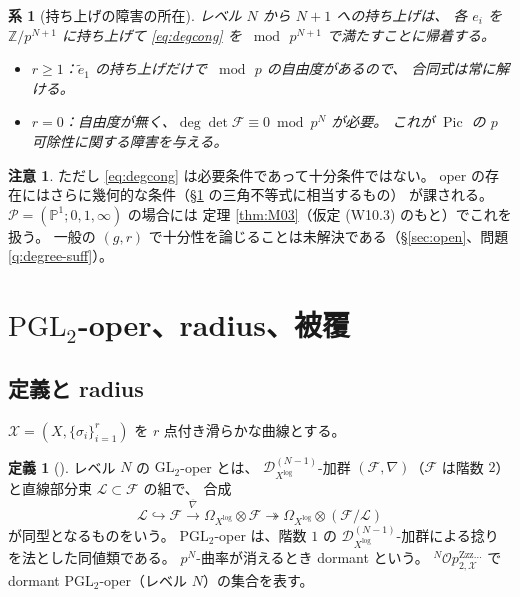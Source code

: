 \documentclass[a4paper,11pt]{ltjsarticle}
\theoremstyle{plain}
\newtheorem{corollary}[theorem]{系}
\theoremstyle{definition}
\newtheorem{definition}[theorem]{定義}
\newtheorem{remark}[theorem]{注意}
\newcommand{\bbP}{\mathbb{P}}
\newcommand{\bbZ}{\mathbb{Z}}
\newcommand{\cD}{\mathcal{D}}
\newcommand{\cF}{\mathcal{F}}
\newcommand{\cL}{\mathcal{L}}
\newcommand{\sX}{\mathscr{X}}
\newcommand{\sP}{\mathscr{P}}
\newcommand{\Pic}{\operatorname{Pic}}
\newcommand{\Op}{\mathcal{O}p}
\newcommand{\Zzz}{\mathrm{Zzz\dots}}
\newcommand{\Dlog}[1]{\cD^{(#1)}_{X^{\log}}}
\begin{document}
\begin{corollary}[持ち上げの障害の所在]\label{cor:obstruction}
レベル $N$ から $N+1$ への持ち上げは、
各 $e_i$ を $\bbZ/p^{N+1}$ に持ち上げて \eqref{eq:degcong} を
$\bmod\,p^{N+1}$ で満たすことに帰着する。
\begin{itemize}[leftmargin=1.6em]
\item $r\ge1$：$\tilde e_1$ の持ち上げだけで $\bmod\,p$ の自由度があるので、
      合同式は常に解ける。
\item $r=0$：自由度が無く、$\deg\det\cF\equiv0\bmod p^{N}$ が必要。
      これが $\Pic$ の $p$ 可除性に関する障害を与える。
\end{itemize}
\end{corollary}

\begin{remark}
ただし \eqref{eq:degcong} は必要条件であって十分条件ではない。
oper の存在にはさらに幾何的な条件（\S\ref{sec:opers} の三角不等式に相当するもの）
が課される。$\sP=(\bbP^1;0,1,\infty)$ の場合には
定理 \ref{thm:M03}（仮定 (W10.3) のもと）でこれを扱う。
一般の $(g,r)$ で十分性を論じることは未解決である（\S\ref{sec:open}、問題 \ref{q:degree-suff}）。
\end{remark}

\section{$\mathrm{PGL}_2$-oper、radius、被覆}\label{sec:opers}

\subsection{定義と radius}

$\sX=(X,\{\sigma_i\}_{i=1}^r)$ を $r$ 点付き滑らかな曲線とする。

\begin{definition}[{\cite[Def.~4.2.1, 4.2.5]{Wak}}]
レベル $N$ の $\mathrm{GL}_2$-oper とは、
$\Dlog{N-1}$-加群 $(\cF,\nabla)$（$\cF$ は階数 $2$）と直線部分束 $\cL\subset\cF$ の組で、
合成
\[
  \cL\hookrightarrow\cF\xrightarrow{\ \overline\nabla\ }
  \Omega_{X^{\log}}\otimes\cF\twoheadrightarrow\Omega_{X^{\log}}\otimes(\cF/\cL)
\]
が同型となるものをいう。
$\mathrm{PGL}_2$-oper は、階数 $1$ の $\Dlog{N-1}$-加群による捻りを法とした同値類である。
$p^N$-曲率が消えるとき dormant という。
${}^N\Op^{\Zzz}_{2,\sX}$ で dormant $\mathrm{PGL}_2$-oper（レベル $N$）の集合を表す。
\end{definition}
\end{document}
